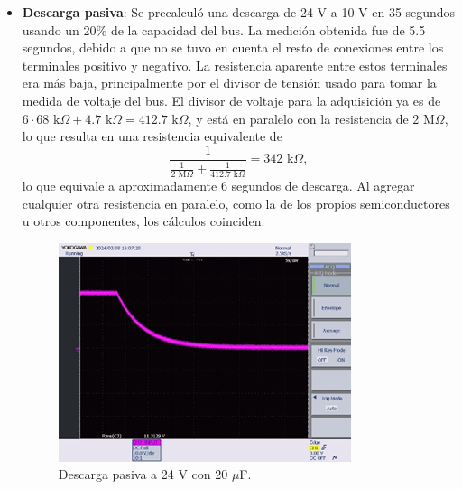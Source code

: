 \begin{itemize}
	\item \textbf{Descarga pasiva}: Se precalculó una descarga de 24 V a 10 V en 35 segundos usando un 20\% de la capacidad del bus. La medición obtenida fue de 5.5 segundos, debido a que no se tuvo en cuenta el resto de conexiones entre los terminales positivo y negativo. La resistencia aparente entre estos terminales era más baja, principalmente por el divisor de tensión usado para tomar la medida de voltaje del bus. El divisor de voltaje para la adquisición ya es de $6 \cdot 68 \text{ k}\Omega + 4.7 \text{ k}\Omega = 412.7 \text{ k}\Omega$, y está en paralelo con la resistencia de $2 \text{ M}\Omega$, lo que resulta en una resistencia equivalente de 
	$$
	\frac{1}{\frac{1}{2 \text{ M}\Omega} + \frac{1}{412.7 \text{ k}\Omega}} = 342 \text{ k}\Omega,
	$$
	lo que equivale a aproximadamente 6 segundos de descarga. Al agregar cualquier otra resistencia en paralelo, como la de los propios semiconductores u otros componentes, los cálculos coinciden.
	
	\begin{figure}[H]
		\centering
		\includegraphics[width=0.7\linewidth]{fig/discharge1}
		\caption{Descarga pasiva a 24 V con 20 $\mu$F.}
	\end{figure}
	

\end{itemize}

